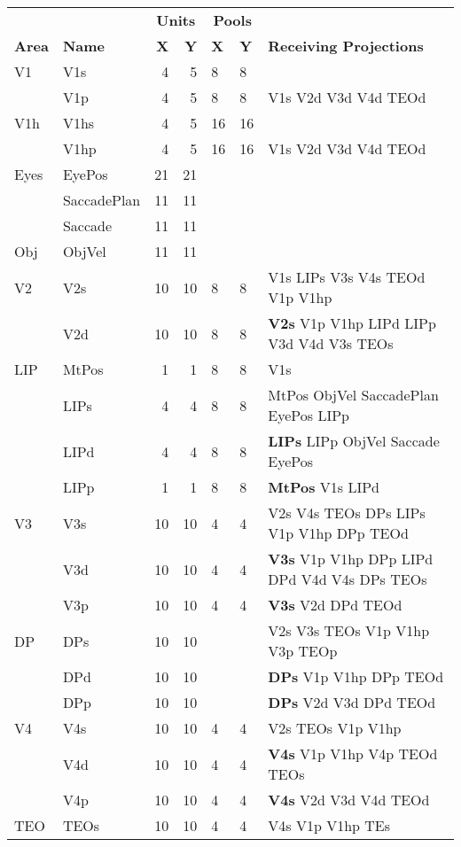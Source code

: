 \documentclass[12pt,twoside]{article}
\newif\myifpdf
\begin{document}
\begin{table}
  \centering
\begin{tabular}{llrrlll}
\hline
     &      & \multicolumn{2}{c}{{\bf Units}} & \multicolumn{2}{c}{{\bf Pools}} & \\
{\bf Area} & {\bf Name} & {\bf X} & {\bf Y} & {\bf X} & {\bf Y} & {\bf Receiving Projections} \\
\hline
V1 & V1s & 4 & 5 & 8 & 8 &  \\
   & V1p & 4 & 5 & 8 & 8 & V1s V2d V3d V4d TEOd  \\
V1h & V1hs & 4 & 5 & 16 & 16 &  \\
   & V1hp & 4 & 5 & 16 & 16 & V1s V2d V3d V4d TEOd  \\
Eyes & EyePos & 21 & 21 & & &  \\
     & SaccadePlan & 11 & 11 & & &  \\
     & Saccade & 11 & 11 & & &  \\
Obj & ObjVel & 11 & 11 & & & \\
V2 & V2s & 10 & 10 & 8 & 8 & V1s LIPs V3s V4s TEOd V1p V1hp \\
   & V2d & 10 & 10 & 8 & 8 & {\bf V2s} V1p V1hp LIPd LIPp V3d V4d V3s TEOs \\
LIP & MtPos& 1 & 1 & 8 & 8 & V1s \\
    & LIPs & 4 & 4 & 8 & 8 & MtPos ObjVel SaccadePlan EyePos LIPp \\
    & LIPd & 4 & 4 & 8 & 8 & {\bf LIPs} LIPp ObjVel Saccade EyePos \\
    & LIPp & 1 & 1 & 8 & 8 & {\bf MtPos} V1s LIPd \\
V3 & V3s & 10 & 10 & 4 & 4 & V2s V4s TEOs DPs LIPs V1p V1hp DPp TEOd \\
   & V3d & 10 & 10 & 4 & 4 & {\bf V3s} V1p V1hp DPp LIPd DPd V4d V4s DPs TEOs \\
   & V3p & 10 & 10 & 4 & 4 & {\bf V3s} V2d DPd TEOd \\
DP & DPs & 10 & 10 & & & V2s V3s TEOs V1p V1hp V3p TEOp \\
   & DPd & 10 & 10 & & & {\bf DPs} V1p V1hp DPp TEOd \\
   & DPp & 10 & 10 & & & {\bf DPs} V2d V3d DPd TEOd \\
V4 & V4s & 10 & 10 & 4 & 4 & V2s TEOs V1p V1hp \\
   & V4d & 10 & 10 & 4 & 4 & {\bf V4s} V1p V1hp V4p TEOd TEOs \\
   & V4p & 10 & 10 & 4 & 4 & {\bf V4s} V2d V3d V4d TEOd \\
TEO & TEOs & 10 & 10 & 4 & 4 & V4s V1p V1hp TEs\\

\end{tabular}
\end{table}
\end{document}
